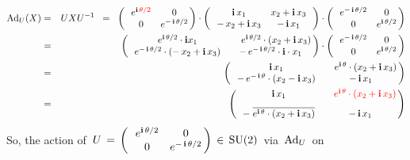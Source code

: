 \begin{eqnarray*}
\textnormal{Ad}_{U}(X)
& = &
	UXU^{-1}
\;\; = \;\;
	\left(\,\begin{array}{cc}
		e^{\i\,{\color{red}\theta/2}} & 0
		\\
		0 & e^{-\,\i\,\theta/2}
		\end{array}\!\!\right)
	\cdot
	\left(\,\begin{array}{cc}
		\i\,x_{1} & x_{2} + \i\,x_{3}
		\\
		- \, x_{2} + \i\,x_{3} & -\,\i\,x_{1}
		\end{array}\,\right)
	\cdot
	\left(\,\begin{array}{cc}
		e^{-\,\i\,\theta/2} & 0
		\\
		0 & e^{\i\,\theta/2}
		\end{array}\!\!\right)
\\
& = &
	\left(\,\begin{array}{cc}
		e^{\i\,\theta/2} \cdot \i x_{1} & \quad\,e^{\i\,\theta/2} \cdot (x_{2} + \i\,x_{3})
		\\
		e^{-\,\i\,\theta/2} \cdot (-\,x_{2} + \i\,x_{3}) & -\,e^{-\,\i\,\theta/2} \cdot \i \cdot x_{1}
		\end{array}\!\!\right)
	\cdot
	\left(\,\begin{array}{cc}
		e^{-\,\i\,\theta/2} & 0
		\\
		0 & e^{\i\,\theta/2}
		\end{array}\!\!\right)
\\
& = &
	\left(\,\begin{array}{cc}
		\i \, x_{1} & \quad{\color{black}e^{\i\,\theta} \cdot (x_{2} + \i\,x_{3})}
		\\
		-\,e^{-\,\i\,\theta} \cdot (x_{2} - \i\,x_{3}) & -\, \i \, x_{1}
		\end{array}\!\!\right)
\\
& = &
	\left(\,\begin{array}{cc}
		\i \, x_{1} & \quad{\color{red}e^{\i\,\theta} \cdot (x_{2} + \i\,x_{3})}
		\\
		\overset{{\color{white}1}}{-\;\overline{e^{\i\,\theta} \cdot (x_{2} + \i\,x_{3})}} & -\, \i \, x_{1}
		\end{array}\!\!\right)
\end{eqnarray*}
So, the action of
\,$U \, = \, \left(\,\begin{array}{cc} e^{\textnormal{\bf i}\,{\color{black}\theta/2}} & 0 \\ 0 & e^{-\,\textnormal{\bf i}\,\theta/2} \end{array}\!\!\right) \,\in\, \textnormal{SU}(2)$\,
via \,$\textnormal{Ad}_{U}$\, on
